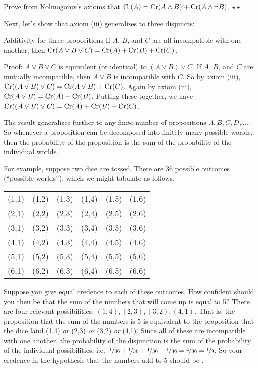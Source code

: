 \begin{exercise}\label{exerc:partition}
  Prove from Kolmogorov's axioms that $\text{Cr}(A) = \text{Cr}(A\land B) + \text{Cr}(A
  \land \neg B)$. $\star\star$
\end{exercise}

Next, let's show that axiom (iii) generalizes to three disjuncts:

\begin{genericthm}{Additivity for three propositions}
  If $A$, $B$, and $C$ are all incompatible with one another, then
  $\text{Cr}(A \lor B \lor C) = \text{Cr}(A) + \text{Cr}(B) + \text{Cr}(C)$.
\end{genericthm}
Proof: $A \lor B \lor C$ is equivalent (or identical) to $(A \lor B) \lor C$. If
$A$, $B$, and $C$ are mutually incompatible, then $A \lor B$ is
incompatible with $C$. So by axiom (iii), $\text{Cr}((A \lor B) \lor C) =
\text{Cr}(A \lor B) + \text{Cr}(C)$. Again by axiom (iii), $\text{Cr}(A \lor B) = \text{Cr}(A)
+ \text{Cr}(B)$. Putting these together, we have $\text{Cr}((A \lor B) \lor C) =
\text{Cr}(A) + \text{Cr}(B) + \text{Cr}(C)$. 

The result generalizes further to any finite number of propositions
$A,B,C,D,\ldots$. So whenever a proposition can be decomposed into
finitely many possible worlds, then the probability of the proposition
is the sum of the probability of the individual worlds.

For example, suppose two dice are tossed. There are 36 possible
outcomes (``possible worlds''), which we might tabulate as follows.
%
\begin{center}
\begin{tabular}{cccccc}
  (1,1) & (1,2) & (1,3) & (1,4) & (1,5) & (1,6)\\
  (2,1) & (2,2) & (2,3) & (2,4) & (2,5) & (2,6)\\
  (3,1) & (3,2) & (3,3) & (3,4) & (3,5) & (3,6)\\
  (4,1) & (4,2) & (4,3) & (4,4) & (4,5) & (4,6)\\
  (5,1) & (5,2) & (5,3) & (5,4) & (5,5) & (5,6)\\
  (6,1) & (6,2) & (6,3) & (6,4) & (6,5) & (6,6)
\end{tabular}
\end{center}
%
Suppose you give equal credence  to each of these
outcomes. How confident should you then be that the sum of the numbers
that will come up is equal to 5? There are four relevant possibilities:
$(1,4), (2,3), (3,2), (4,1)$. That is, the proposition that the sum of
the numbers is 5 is equivalent to the proposition that the dice land
(1,4) \emph{or} (2,3) \emph{or} (3,2) \emph{or} (4,1).  Since all of
these are incompatible with one another, the probability of the
disjunction is the sum of the probability of the individual
possibilities, i.e.\ $\nicefrac{1}{36} + \nicefrac{1}{36} +
\nicefrac{1}{36} + \nicefrac{1}{36} = \nicefrac{4}{36} =
\nicefrac{1}{9}$. So your credence in the hypothesis that the numbers
add to 5 should be .

